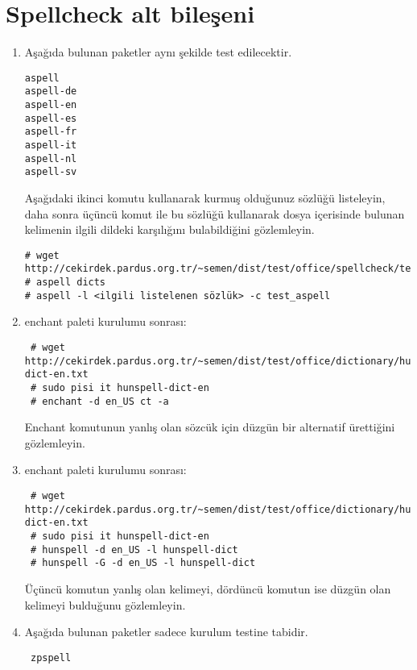 \documentclass[a4paper,10pt]{article}
\begin{document}
\section{ Spellcheck alt bileşeni}
\begin{enumerate}
\item Aşağıda bulunan paketler aynı şekilde test edilecektir.
\begin{verbatim}
aspell
aspell-de
aspell-en
aspell-es
aspell-fr
aspell-it
aspell-nl
aspell-sv 
\end{verbatim}

Aşağıdaki ikinci komutu kullanarak kurmuş olduğunuz sözlüğü listeleyin, daha sonra üçüncü komut ile bu sözlüğü kullanarak dosya içerisinde bulunan kelimenin ilgili dildeki karşılığını bulabildiğini gözlemleyin.
\begin{verbatim}
# wget http://cekirdek.pardus.org.tr/~semen/dist/test/office/spellcheck/test_aspell
# aspell dicts
# aspell -l <ilgili listelenen sözlük> -c test_aspell
\end{verbatim}
\item enchant paleti kurulumu sonrası:
\begin{verbatim}
 # wget http://cekirdek.pardus.org.tr/~semen/dist/test/office/dictionary/hunspell-dict-en.txt
 # sudo pisi it hunspell-dict-en
 # enchant -d en_US ct -a
\end{verbatim}
Enchant komutunun yanlış olan sözcük için düzgün bir alternatif ürettiğini gözlemleyin.

\item enchant paleti kurulumu sonrası:
\begin{verbatim}
 # wget http://cekirdek.pardus.org.tr/~semen/dist/test/office/dictionary/hunspell-dict-en.txt
 # sudo pisi it hunspell-dict-en
 # hunspell -d en_US -l hunspell-dict
 # hunspell -G -d en_US -l hunspell-dict
\end{verbatim}
Üçüncü komutun yanlış olan kelimeyi, dördüncü komutun ise düzgün olan kelimeyi bulduğunu gözlemleyin.

\item Aşağıda bulunan paketler sadece kurulum testine tabidir.
\begin{verbatim}
 zpspell
\end{verbatim}

\end{enumerate}
\end{document}

